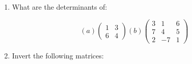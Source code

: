 \documentclass{article}
\begin{document}
\begin{enumerate}


\item What are the determinants of:

\begin{displaymath}
(a) \left( \begin{array}{rr} 1 & 3 \\ 6 & 4 \end{array} \right)
(b) \left( \begin{array}{rrr} 3 & 1 & 6 \\ 7 & 4 & 5 \\ 2 & -7 & 1 \end{array} \right)
\end{displaymath}


\item Invert the following matrices:


\end{enumerate}
\end{document}
